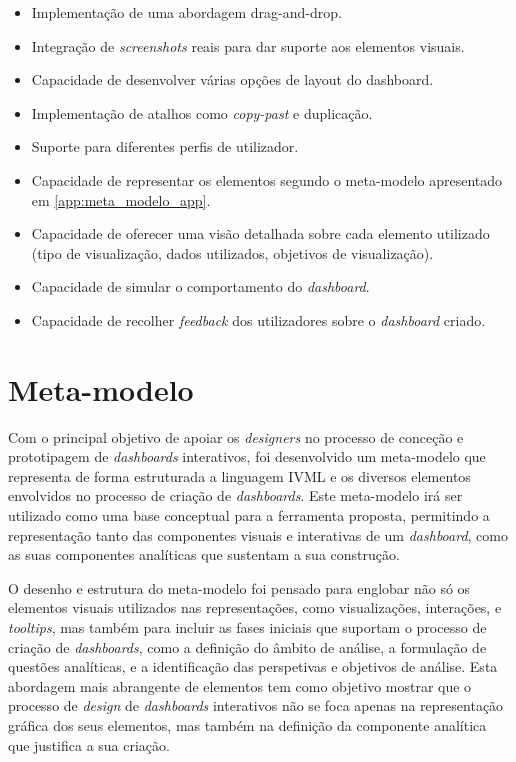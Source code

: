 \begin{itemize}
  \item Implementação de uma abordagem drag-and-drop.
  \item Integração de \textit{screenshots} reais para dar suporte aos elementos visuais.
  \item Capacidade de desenvolver várias opções de layout do dashboard.
  \item Implementação de atalhos como \textit{copy-past} e duplicação.
  \item Suporte para diferentes perfis de utilizador.
  \item Capacidade de representar os elementos segundo o meta-modelo apresentado em \ref{app:meta_modelo_app}.
  \item Capacidade de oferecer uma visão detalhada sobre cada elemento utilizado (tipo de visualização, dados utilizados, objetivos de visualização).
  \item Capacidade de simular o comportamento do \textit{dashboard}.
  \item Capacidade de recolher \textit{feedback} dos utilizadores sobre o \textit{dashboard} criado.
\end{itemize}

\section{Meta-modelo} %
\label{sec:meta_modelo}

Com o principal objetivo de apoiar os \textit{designers} no processo de conceção e prototipagem de \textit{dashboards} interativos, foi desenvolvido um meta-modelo que representa de forma estruturada a linguagem IVML e os diversos elementos envolvidos no processo de criação de \textit{dashboards}. Este meta-modelo irá ser utilizado como uma base conceptual para a ferramenta proposta, permitindo a representação tanto das componentes visuais e interativas de um \textit{dashboard}, como as suas componentes analíticas que sustentam a sua construção.

O desenho e estrutura do meta-modelo foi pensado para englobar não só os elementos visuais utilizados nas representações, como visualizações, interações, e \textit{tooltips}, mas também para incluir as fases iniciais que suportam o processo de criação de \textit{dashboards}, como a definição do âmbito de análise, a formulação de questões analíticas, e a identificação das perspetivas e objetivos de análise. Esta abordagem mais abrangente de elementos tem como objetivo mostrar que o processo de \textit{design} de \textit{dashboards} interativos não se foca apenas na representação gráfica dos seus elementos, mas também na definição da componente analítica que justifica a sua criação.

